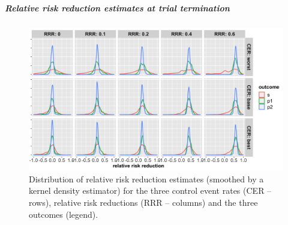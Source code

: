 \documentclass[]{article}
\let\oldsubparagraph\subparagraph
\renewcommand{\subparagraph}[1]{\oldsubparagraph{#1}\mbox{}}
\begin{document}
\clearpage

\hypertarget{relative-risk-reduction-estimates-at-trial-termination-1}{%
\subparagraph{Relative risk reduction estimates at trial
termination}\label{relative-risk-reduction-estimates-at-trial-termination-1}}

\begin{figure}
  \caption{Distribution of relative risk reduction estimates (smoothed by a kernel density estimator) for the three
  control event rates (CER – rows), relative risk reductions (RRR – columns) and the three outcomes (legend).}
  \includegraphics{../p1_plots/batch_size_nb_2000/RRRhat_p1.png}
\end{figure}
\end{document}
